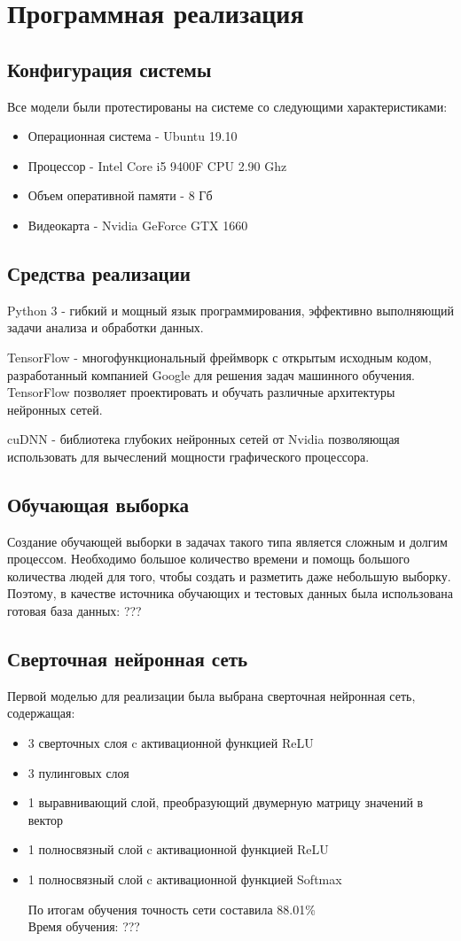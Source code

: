 \section{Программная реализация}

\subsection{Конфигурация системы}
Все модели были протестированы на системе со следующими характеристиками:
\begin{itemize}
  \item Операционная система - Ubuntu 19.10
  \item Процессор - Intel Core i5 9400F CPU 2.90 Ghz
  \item Объем оперативной памяти - 8 Гб
  \item Видеокарта - Nvidia GeForce GTX 1660
\end{itemize}

\subsection{Средства реализации}
Python 3 - гибкий и мощный язык программирования, эффективно выполняющий задачи анализа и обработки данных. 

TensorFlow - многофункциональный фреймворк с открытым исходным кодом, разработанный компанией Google для решения задач машинного обучения. TensorFlow позволяет проектировать и обучать различные архитектуры нейронных сетей.

cuDNN - библиотека глубоких нейронных сетей от Nvidia позволяющая использовать для вычеслений мощности графического процессора. 
\subsection{Обучающая выборка}
Создание обучающей выборки в задачах такого типа является сложным
и долгим процессом. Необходимо большое количество времени и помощь
большого количества людей для того, чтобы создать и разметить
даже небольшую выборку.
Поэтому, в качестве источника обучающих и тестовых данных была использована готовая база данных: ???

\subsection{Сверточная нейронная сеть}
Первой моделью для реализации была выбрана сверточная нейронная сеть, содержащая:
\begin{itemize}
  \item 3 сверточных слоя c активационной функцией ReLU
  \item 3 пулинговых слоя
  \item 1 выравнивающий слой, преобразующий двумерную матрицу значений в вектор
  \item 1 полносвязный слой c активационной функцией ReLU
  \item 1 полносвязный слой c активационной функцией Softmax

  По итогам обучения точность сети составила 88.01\% \\
  Время обучения: ???
  
\end{itemize}
